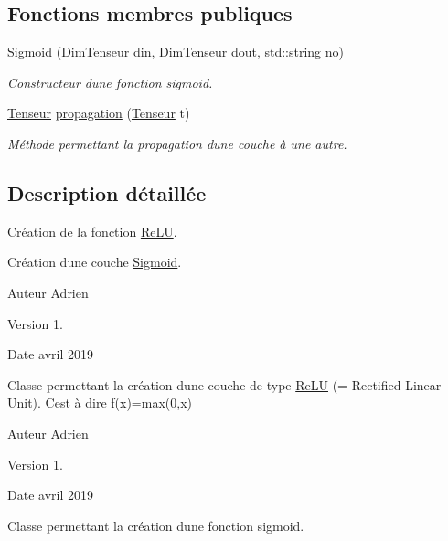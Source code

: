 \subsection*{Fonctions membres publiques}
\begin{DoxyCompactItemize}
\item 
\mbox{\label{classSigmoid_a6085e021ce6eb13fd04b46387f4b3ccf}} 
\hyperlink{classSigmoid_a6085e021ce6eb13fd04b46387f4b3ccf}{Sigmoid} (\hyperlink{classDimTenseur}{Dim\+Tenseur} din, \hyperlink{classDimTenseur}{Dim\+Tenseur} dout, std\+::string no)
\begin{DoxyCompactList}\small\item\em Constructeur d\textquotesingle{}une fonction sigmoid. \end{DoxyCompactList}\item 
\hyperlink{classTenseur}{Tenseur} \hyperlink{classSigmoid_a6bd1f6bbc49bd7e634dc33701aee420c}{propagation} (\hyperlink{classTenseur}{Tenseur} t)
\begin{DoxyCompactList}\small\item\em Méthode permettant la propagation d\textquotesingle{}une couche à une autre. \end{DoxyCompactList}\end{DoxyCompactItemize}


\subsection{Description détaillée}
Création de la fonction \hyperlink{classReLU}{Re\+LU}. 

Création d\textquotesingle{}une couche \hyperlink{classSigmoid}{Sigmoid}.

\begin{DoxyAuthor}{Auteur}
Adrien 
\end{DoxyAuthor}
\begin{DoxyVersion}{Version}
1. 
\end{DoxyVersion}
\begin{DoxyDate}{Date}
avril 2019
\end{DoxyDate}
Classe permettant la création d\textquotesingle{}une couche de type \hyperlink{classReLU}{Re\+LU} (= Rectified Linear Unit). C\textquotesingle{}est à dire f(x)=max(0,x)

\begin{DoxyAuthor}{Auteur}
Adrien 
\end{DoxyAuthor}
\begin{DoxyVersion}{Version}
1. 
\end{DoxyVersion}
\begin{DoxyDate}{Date}
avril 2019
\end{DoxyDate}
Classe permettant la création d\textquotesingle{}une fonction sigmoid. 

